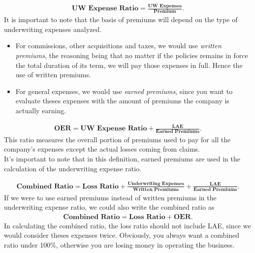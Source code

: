 \documentclass[11pt, english]{memoir}
\numberwithin{definition}{section}
\begin{document}
\begin{tcolorbox}[adjusted title = \textbf{Underwriting Expense Ratio}, boxrule = 0mm]
\begin{align*}
\textbf{UW Expense Ratio} = \frac{\textbf{UW Expenses}}{\textbf{Premium}} .
\end{align*}
It is important to note that the basis of premiums will depend on the type of underwriting expenses analyzed. 
\begin{itemize}
\item For commissions, other acquisitions and taxes, we would use \emph{written premiums}, the reasoning being that no matter if the policies remains in force the total duration of its term, we will pay those expenses in full. Hence the use of written premiums.
\item For general expenses, we would use \emph{earned premiums}, since you want to evaluate theses expenses with the amount of premiums the company is actually earning. 
\end{itemize}
\end{tcolorbox}


\begin{tcolorbox}[adjusted title = \textbf{Operating Expenses Ratio (OER)}, boxrule = 0mm]
\begin{align*}
\textbf{OER} = \textbf{UW Expense Ratio} + \frac{\textbf{LAE}}{\textbf{Earned Premiums}} .
\end{align*}
This ratio measures the overall portion of premiums used to pay for all the company's expenses except the actual losses coming from claims. \\

It's important to note that in this definition, earned premiums are used in the calculation of the underwriting expense ratio. 
\end{tcolorbox}


\begin{tcolorbox}[adjusted title = \textbf{Combined Ratio}, boxrule = 0mm]
\begin{align*}
\textbf{Combined Ratio} = \textbf{Loss Ratio} + \frac{\textbf{Underwriting Expenses}}{\textbf{Written Premiums}} + \frac{\textbf{LAE}}{\textbf{Earned Premiums}} .
\end{align*}
If we were to use earned premiums instead of written premiums in the underwriting expense ratio, we could also write the combined ratio as 
\begin{align*}
\textbf{Combined Ratio} = \textbf{Loss Ratio} + \textbf{OER}.
\end{align*}
In calculating the combined ratio, the loss ratio should not include LAE, since we would consider theses expenses twice. Obviously, you always want a combined ratio under 100\%, otherwise you are losing money in operating the business. 
\end{tcolorbox}
\end{document}

